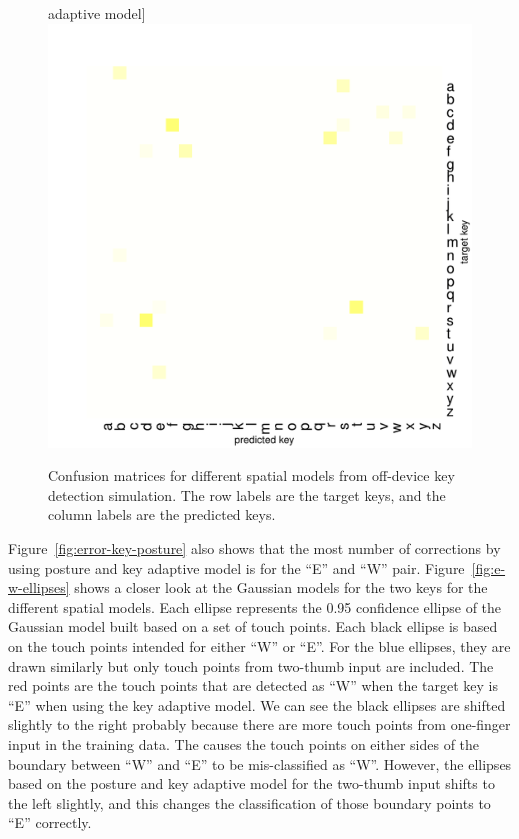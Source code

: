 \documentclass{sigchi}
\begin{document}
\begin{figure}[tb]
  adaptive model]{
    \includegraphics[width=0.49\columnwidth]{figures/sim-result-2-1.pdf}
    \label{fig:error-posture-key}
  }
  \caption{Confusion matrices for different
  spatial models from off-device key detection simulation. The row labels are the
  target keys, and the column labels are the predicted keys.}
  \label{fig:confusion-matrices}
\end{figure}

Figure~\ref{fig:error-key-posture} also shows that the most number of
corrections by using posture and key adaptive model is for the ``E'' and ``W'' pair. Figure~\ref{fig:e-w-ellipses}
shows a closer look at the Gaussian models for the two keys for the different
spatial models. Each ellipse represents the 0.95 confidence ellipse of the Gaussian model built 
based on a set of touch points.
Each black ellipse is based on the touch points intended for either ``W'' or ``E''. 
For the blue ellipses, they are drawn similarly but only touch points from two-thumb input
are included. The red points are the touch points that are detected as ``W'' when the target
key is ``E'' when using the key adaptive model. We can see the black ellipses are shifted
slightly to the right probably because there are more touch points from one-finger input in the training
data. The causes the touch points on either sides of the boundary between ``W'' and 
``E'' to be mis-classified as ``W''. However, the ellipses based on the posture and key
adaptive model for the two-thumb input shifts to the left slightly, and this changes
the classification of those boundary points to ``E'' correctly.
\end{document}
